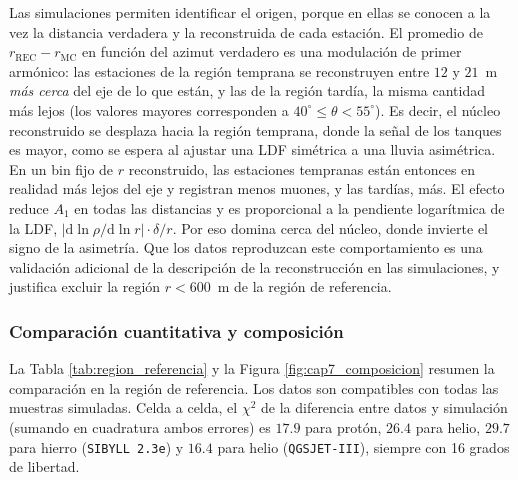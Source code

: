 Las simulaciones permiten identificar el origen, porque en ellas se conocen a la vez la distancia verdadera y la reconstruida de cada estación. El promedio de $r_\mathrm{REC} - r_\mathrm{MC}$ en función del azimut verdadero es una modulación de primer armónico: las estaciones de la región temprana se reconstruyen entre $12$ y $21$~m \emph{más cerca} del eje de lo que están, y las de la región tardía, la misma cantidad más lejos (los valores mayores corresponden a $40^\circ \leq \theta < 55^\circ$). Es decir, el núcleo reconstruido se desplaza hacia la región temprana, donde la señal de los tanques es mayor, como se espera al ajustar una LDF simétrica a una lluvia asimétrica.
En un bin fijo de $r$ reconstruido, las estaciones tempranas están entonces en realidad más lejos del eje y registran menos muones, y las tardías, más. El efecto reduce $A_1$ en todas las distancias y es proporcional a la pendiente logarítmica de la LDF, $|\mathrm{d}\ln\rho/\mathrm{d}\ln r| \cdot \delta/r$. Por eso domina cerca del núcleo, donde invierte el signo de la asimetría. Que los datos reproduzcan este comportamiento es una validación adicional de la descripción de la reconstrucción en las simulaciones, y justifica excluir la región $r < 600$~m de la región de referencia.

\subsubsection{Comparación cuantitativa y composición}

La Tabla \ref{tab:region_referencia} y la Figura \ref{fig:cap7_composicion} resumen la comparación en la región de referencia. Los datos son compatibles con todas las muestras simuladas. Celda a celda, el $\chi^2$ de la diferencia entre datos y simulación (sumando en cuadratura ambos errores) es $17.9$ para protón, $26.4$ para helio, $29.7$ para hierro (\texttt{SIBYLL 2.3e}) y $16.4$ para helio (\texttt{QGSJET-III}), siempre con 16 grados de libertad.

